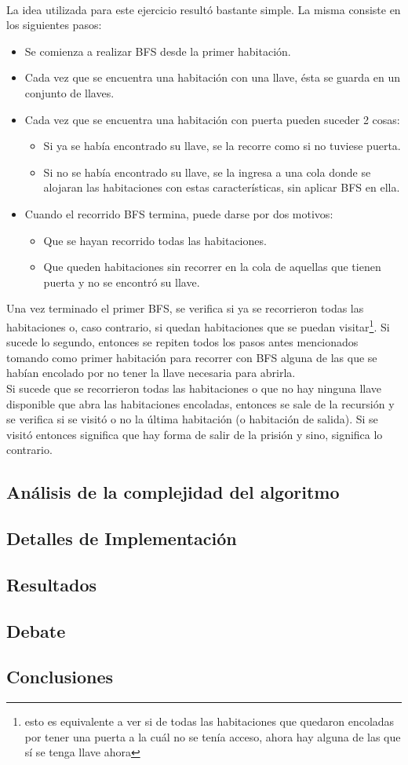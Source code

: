 \paragraph{}
La idea utilizada para este ejercicio resultó bastante simple. La misma consiste en los siguientes pasos:
\begin{itemize}
	\item Se comienza a realizar BFS desde la primer habitación.
	\item Cada vez que se encuentra una habitación con una llave, ésta se guarda en un conjunto de llaves.
	\item Cada vez que se encuentra una habitación con puerta pueden suceder 2 cosas:
	\begin{itemize}
		\item Si ya se había encontrado su llave, se la recorre como si no tuviese puerta.
		\item Si no se había encontrado su llave, se la ingresa a una cola donde se alojaran las habitaciones con estas características, sin aplicar BFS en ella.
	\end{itemize}
	\item Cuando el recorrido BFS termina, puede darse por dos motivos:
	\begin{itemize}
		\item Que se hayan recorrido todas las habitaciones.
		\item Que queden habitaciones sin recorrer en la cola de aquellas que tienen puerta y no se encontró su llave.
	\end{itemize}
\end{itemize}

Una vez terminado el primer BFS, se verifica si ya se recorrieron todas las habitaciones o, caso contrario, si quedan habitaciones que se puedan visitar\footnote{esto es equivalente a ver si de todas las habitaciones que quedaron encoladas por tener una puerta a la cuál no se tenía acceso, ahora hay alguna de las que sí se tenga llave ahora}. Si sucede lo segundo, entonces se repiten todos los pasos antes mencionados tomando como primer habitación para recorrer con BFS alguna de las que se habían encolado por no tener la llave necesaria para abrirla.\\
Si sucede que se recorrieron todas las habitaciones o que no hay ninguna llave disponible que abra las habitaciones encoladas, entonces se sale de la recursión y se verifica si se visitó o no la última habitación (o habitación de salida). Si se visitó entonces significa que hay forma de salir de la prisión y sino, significa lo contrario.

\subsection{Análisis de la complejidad del algoritmo}
\subsection{Detalles de Implementación}
\subsection{Resultados}
\subsection{Debate}
\subsection{Conclusiones}
